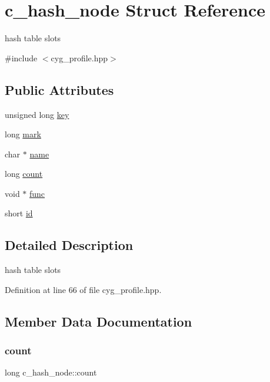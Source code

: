 \hypertarget{structc__hash__node}{}\section{c\+\_\+hash\+\_\+node Struct Reference}
\label{structc__hash__node}


hash table slots  




{\ttfamily \#include $<$cyg\+\_\+profile.\+hpp$>$}

\subsection*{Public Attributes}
\begin{DoxyCompactItemize}
\item 
unsigned long \hyperlink{structc__hash__node_a83dedd9d9f8b425832404116b456b46d}{key}
\item 
long \hyperlink{structc__hash__node_af5199f281a298c18ee13e8fc8a86359e}{mark}
\item 
char $\ast$ \hyperlink{structc__hash__node_adb4fc5dcf1d4a4e4b4b79db0bc40046f}{name}
\item 
long \hyperlink{structc__hash__node_a560e0249668dacf880602ef181ad339c}{count}
\item 
void $\ast$ \hyperlink{structc__hash__node_a3b00ec567a576f3677911f8b8e421de0}{func}
\item 
short \hyperlink{structc__hash__node_a1ef613164cb42133cc969fa92732cf5f}{id}
\end{DoxyCompactItemize}


\subsection{Detailed Description}
hash table slots 

Definition at line 66 of file cyg\+\_\+profile.\+hpp.



\subsection{Member Data Documentation}
\mbox{\label{structc__hash__node_a560e0249668dacf880602ef181ad339c}} 
\subsubsection{\texorpdfstring{count}{count}}
{\footnotesize\ttfamily long c\+\_\+hash\+\_\+node\+::count}



